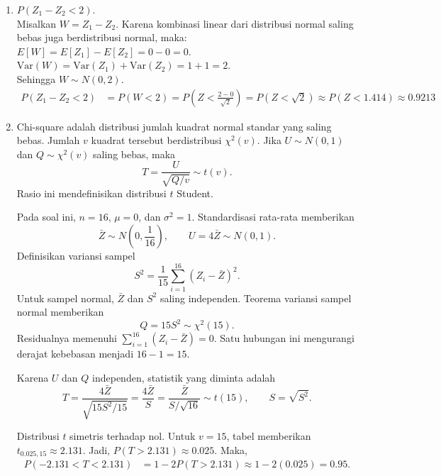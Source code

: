 \documentclass[11pt,letterpaper]{article}
\begin{document}
\begin{enumerate}
\begin{enumerate}[label=(\alph*)]
          \item $P(Z_1 - Z_2 < 2)$. \\
                Misalkan $W = Z_1 - Z_2$. Karena kombinasi linear dari distribusi normal saling bebas juga berdistribusi normal, maka:
                $E[W] = E[Z_1] - E[Z_2] = 0 - 0 = 0$. \\
                $\text{Var}(W) = \text{Var}(Z_1) + \text{Var}(Z_2) = 1 + 1 = 2$. \\
                Sehingga $W \sim N(0, 2)$.
                \begin{align*}
                  P(Z_1 - Z_2 < 2) & = P(W < 2)                = P\left( Z < \frac{2 - 0}{\sqrt{2}} \right) = P(Z < \sqrt{2}) \approx P(Z < 1.414)       \approx 0.9213
                \end{align*}

          \item Chi-square adalah distribusi jumlah kuadrat normal standar yang saling bebas.
                Jumlah $v$ kuadrat tersebut berdistribusi $\chi^2(v)$.
                Jika $U\sim N(0,1)$ dan $Q\sim\chi^2(v)$ saling bebas, maka
                \[
                  T=\frac{U}{\sqrt{Q/v}}\sim t(v).
                \]
                Rasio ini mendefinisikan distribusi $t$ Student.

                Pada soal ini, $n=16$, $\mu=0$, dan $\sigma^2=1$.
                Standardisasi rata-rata memberikan
                \[
                  \bar{Z}\sim N\left(0,\frac{1}{16}\right),
                  \qquad U=4\bar{Z}\sim N(0,1).
                \]
                Definisikan variansi sampel
                \[
                  S^2=\frac{1}{15}\sum_{i=1}^{16}(Z_i-\bar{Z})^2.
                \]
                Untuk sampel normal, $\bar{Z}$ dan $S^2$ saling independen.
                Teorema variansi sampel normal memberikan
                \[
                  Q=15S^2\sim\chi^2(15).
                \]
                Residualnya memenuhi $\sum_{i=1}^{16}(Z_i-\bar{Z})=0$.
                Satu hubungan ini mengurangi derajat kebebasan menjadi $16-1=15$.

                Karena $U$ dan $Q$ independen, statistik yang diminta adalah
                \[
                  T=\frac{4\bar{Z}}{\sqrt{15S^2/15}}
                  =\frac{4\bar{Z}}{S}
                  =\frac{\bar{Z}}{S/\sqrt{16}}
                  \sim t(15),
                  \qquad S=\sqrt{S^2}.
                \]

                Distribusi $t$ simetris terhadap nol.
                Untuk $v=15$, tabel memberikan $t_{0.025,15}\approx2.131$.
                Jadi, $P(T>2.131)\approx0.025$.
                Maka,
                \begin{align*}
                  P(-2.131<T<2.131)
                   & =1-2P(T>2.131)
                  \approx1-2(0.025)
                  =0.95.
                \end{align*}
        \end{enumerate}
\end{enumerate}
\end{document}
